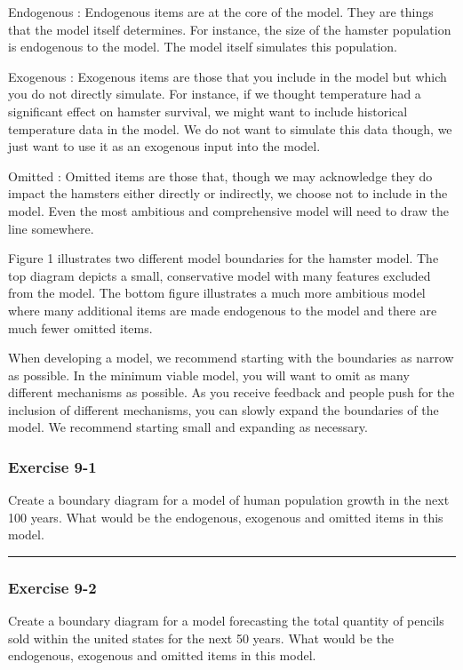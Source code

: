 \documentclass[]{memoir}
\begin{document}
Endogenous : Endogenous items are at the core of the model. They are
things that the model itself determines. For instance, the size of the
hamster population is endogenous to the model. The model itself
simulates this population.

Exogenous : Exogenous items are those that you include in the model but
which you do not directly simulate. For instance, if we thought
temperature had a significant effect on hamster survival, we might want
to include historical temperature data in the model. We do not want to
simulate this data though, we just want to use it as an exogenous input
into the model.

Omitted : Omitted items are those that, though we may acknowledge they
do impact the hamsters either directly or indirectly, we choose not to
include in the model. Even the most ambitious and comprehensive model
will need to draw the line somewhere.

Figure 1 illustrates two different model boundaries for the hamster
model. The top diagram depicts a small, conservative model with many
features excluded from the model. The bottom figure illustrates a much
more ambitious model where many additional items are made endogenous to
the model and there are much fewer omitted items.

When developing a model, we recommend starting with the boundaries as
narrow as possible. In the minimum viable model, you will want to omit
as many different mechanisms as possible. As you receive feedback and
people push for the inclusion of different mechanisms, you can slowly
expand the boundaries of the model. We recommend starting small and
expanding as necessary.

\subsubsection{Exercise 9-1}

Create a boundary diagram for a model of human population growth in the
next 100 years. What would be the endogenous, exogenous and omitted
items in this model.

\begin{center}\rule{3in}{0.4pt}\end{center}

\subsubsection{Exercise 9-2}

Create a boundary diagram for a model forecasting the total quantity of
pencils sold within the united states for the next 50 years. What would
be the endogenous, exogenous and omitted items in this model.
\end{document}
